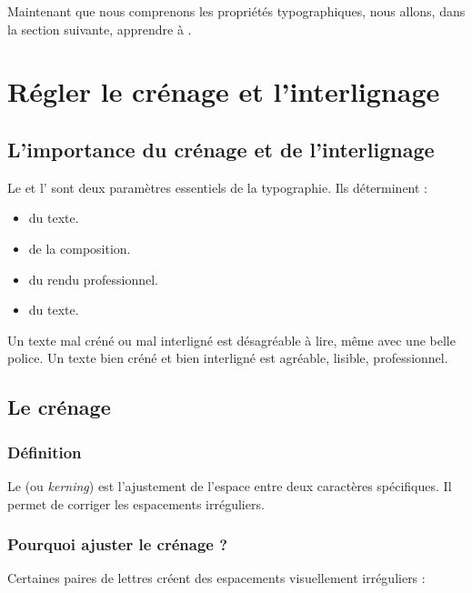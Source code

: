 Maintenant que nous comprenons les propriétés typographiques, nous allons, dans la section suivante, apprendre à .

\section{Régler le crénage et l'interlignage}

\subsection{L'importance du crénage et de l'interlignage}

Le  et l' sont deux paramètres essentiels de la typographie. Ils déterminent :

\begin{itemize}
    \item {} du texte.
    \item {} de la composition.
    \item {} du rendu professionnel.
    \item {} du texte.
\end{itemize}

Un texte mal créné ou mal interligné est désagréable à lire, même avec une belle police. Un texte bien créné et bien interligné est agréable, lisible, professionnel.

\subsection{Le crénage}

\subsubsection{Définition}

Le  (ou \emph{kerning}) est l'ajustement de l'espace entre deux caractères spécifiques. Il permet de corriger les espacements irréguliers.

\subsubsection{Pourquoi ajuster le crénage ?}

Certaines paires de lettres créent des espacements visuellement irréguliers :

